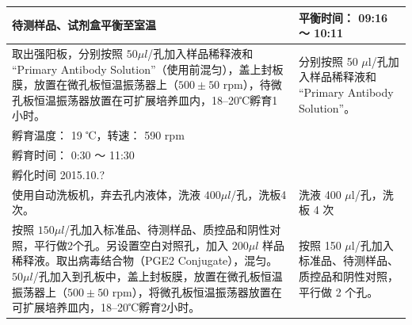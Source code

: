 \documentclass[UTF8,10pt,a4paper,fontset=fandol]{ctexart}
\newcommand{\fieldvalue}[1]{#1}
\newcommand{\handwritten}[1]{#1}
\begin{document}
\begin{tabularx}{\textwidth}{|p{}|X|}
\hline
待测样品、试剂盒平衡至室温 &
平衡时间：
\fieldvalue{\handwritten{09:16 ～ 10:11}}\\
\hline
取出强阳板，分别按照 $50\mu l$/孔加入样品稀释液和 ``Primary Antibody Solution''（使用前混匀），盖上封板膜，放置在微孔板恒温振荡器上（$500\pm50$ rpm），待微孔板恒温振荡器放置在可扩展培养皿内，18--20℃孵育1小时。 &
分别按照
\fieldvalue{\handwritten{50}} $\mu$l/孔加入样品稀释液和 ``Primary Antibody Solution''。\\
孵育温度：
\fieldvalue{\handwritten{19}} ℃，转速：
\fieldvalue{\handwritten{590}} rpm\\
孵育时间：
\fieldvalue{\handwritten{0:30}} ～ 
\fieldvalue{\handwritten{11:30}}\\
\handwritten{孵化时间 2015.10.?}\\
\hline
使用自动洗板机，弃去孔内液体，洗液 $400\mu l$/孔，洗板4次。 &
洗液
\fieldvalue{\handwritten{400}} $\mu$l/孔，洗板
\fieldvalue{\handwritten{4}} 次\\
\hline
按照 $150\mu l$/孔加入标准品、待测样品、质控品和阴性对照，平行做2个孔。另设置空白对照孔，加入 $200\mu l$ 样品稀释液。取出病毒结合物（PGE2 Conjugate），混匀。$50\mu l$/孔加入到孔板中，盖上封板膜，放置在微孔板恒温振荡器上（$500\pm50$ rpm），将微孔板恒温振荡器放置在可扩展培养皿内，18--20℃孵育2小时。 &
按照
\fieldvalue{\handwritten{150}} $\mu$l/孔加入标准品、待测样品、质控品和阴性对照，平行做
\fieldvalue{\handwritten{2}} 个孔。\\

\end{tabularx}
\end{document}
